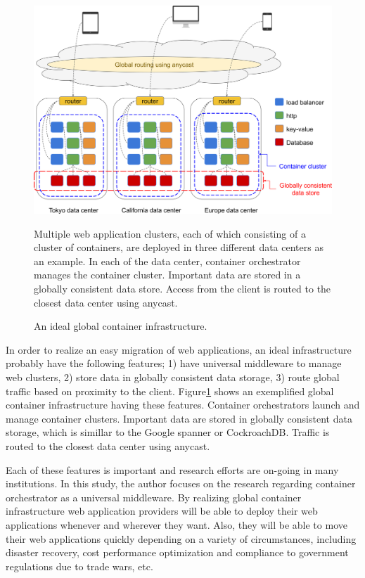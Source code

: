 \begin{figure}[h]
\begin{center}
\includegraphics[width=0.9\columnwidth]{Figs/global_container_infrastructure}
\end{center}
\caption{
An ideal global container infrastructure.
}
\centering\parbox[c]{0.9\columnwidth}{
Multiple web application clusters, each of which consisting of a cluster of containers, are deployed in three different data centers as an example.
In each of the data center, container orchestrator manages the container cluster.
Important data are stored in a globally consistent data store.
Access from the client is routed to the closest data center using anycast.
}
\label{fig:global_container_infrastructure}
\end{figure}

In order to realize an easy migration of web applications, an ideal infrastructure probably have the following features;
1) have universal middleware to manage web clusters,
2) store data in globally consistent data storage,
3) route global traffic based on proximity to the client.
%
Figure\ref{fig:global_container_infrastructure} shows an exemplified global container infrastructure having these features.
Container orchestrators launch and manage container clusters.
Important data are stored in globally consistent data storage, which is simillar to the Google spanner\cite{Corbett:2013:SGG:2518037.2491245,Cooper:2013:SGG:2485732.2485756} or CockroachDB\cite{pavlo2016s}.
Traffic is routed to the closest data center using anycast\cite{rfc1546}.

Each of these features is important and research efforts are on-going in many institutions.
In this study, the author focuses on the research regarding container orchestrator as a universal middleware.
%
By realizing global container infrastructure web application providers will be able to deploy their web applications whenever and wherever they want.
Also, they will be able to move their web applications quickly depending on a variety of circumstances, including disaster recovery, cost performance optimization and compliance to government regulations due to trade wars, etc.


